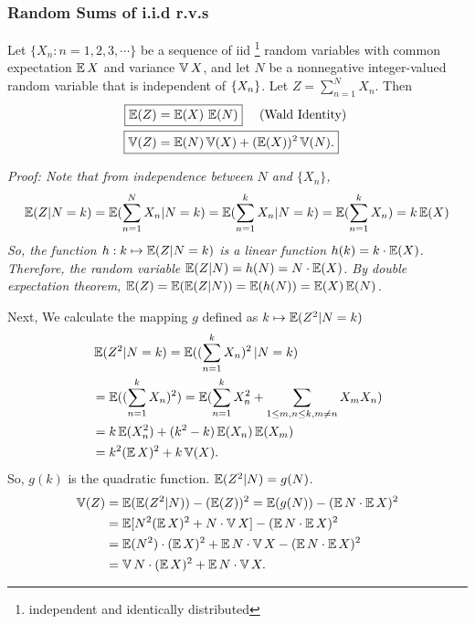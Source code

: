 \documentclass[english,10pt,handout]{beamer}
\begin{document}
\begin{frame}
\frametitle{Random Sums of i.i.d r.v.s }
Let $\{X_n: n =1, 2, 3, \cdots\}$  be a sequence of iid \footnote{independent and identically distributed} random variables with common 
expectation $\e X$ and variance $\Var X$, and let $N$ be a nonnegative integer-valued random variable that is independent of 
$\set{X_n}$. Let $Z=\sum_{n=1}^N X_n$.
Then  
\begin{align*}
\Aboxed{\e (Z) &=\e( X)\,  \e (N)} ~~~\mbox{ (Wald Identity) }
\\
\Aboxed{\Var(Z)&= \e(N)  \Var(X) + (\e(X))^2 \Var(N).}
\end{align*}
\pause
{\it Proof:
Note that from independence between $N$ and $\{X_n\}$, 
\[ \e(Z|N=k)= \e(\sum_{n=1}^N X_n|N=k)=\e(\sum_{n=1}^k X_n|N=k) =\e(\sum_{n=1}^k X_n)= k \e(X) \] 
So, the function $h: k\mapsto \e(Z|N=k) $ is a linear function $h(k)=k \cdot \e(X)$. Therefore, the random variable $\e(Z|N)=h(N) = N\cdot \e(X)$.
By double expectation theorem,  $\e(Z) = \e( \e(Z|N))= \e(h(N)) = \e( X) \e(N)$.

}
\end{frame}

\frame
{
Next, We calculate the mapping $g$ defined as $ k\mapsto \e(Z^2|N=k)$
\[ 
\begin{split}
&\e(Z^2|N=k)= \e ((\sum_{n=1}^k  X_n)^2\,  \vert N=k )\\
&=\e ((\sum_{n=1}^k  X_n)^2 )=\e (\sum_{n=1}^k  X^2_n+ \sum_{1\leq m,n\leq k, m\neq n} X_m X_n   )\\
& =k \e(X_n^2) + (k^2-k) \e(X_n) \e(X_m)\\
&=k^2 (\e X)^2 + k \Var (X).\\
\end{split}
\]
So, $g(k)$ is the quadratic function. $\e(Z^2|N)=g(N)$.
\[
\begin{split}
\Var(Z)&= \e(\e(Z^2|N)) - (\e(Z))^2
=\e(g(N))- (\e N \cdot \e X)^2\\
&=\e[N^2 (\e X)^2  +N\cdot \Var X ]- (\e N \cdot \e X)^2\\ 
&=\e(N^2)\cdot (\e X)^2  +\e N \cdot \Var X- (\e N \cdot \e X)^2\\
&=\Var N \cdot (\e X)^2  +\e N \cdot \Var X.
\end{split}\]
}
\end{document}
